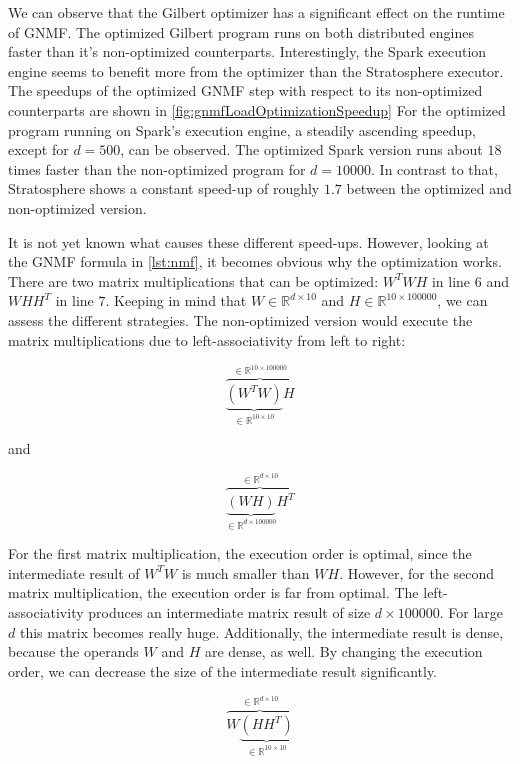 We can observe that the Gilbert optimizer has a significant effect on the runtime of GNMF.
The optimized Gilbert program runs on both distributed engines faster than it's non-optimized counterparts.
Interestingly, the Spark execution engine seems to benefit more from the optimizer than the Stratosphere executor.
The speedups of the optimized GNMF step with respect to its non-optimized counterparts are shown in \cref{fig:gnmfLoadOptimizationSpeedup}
For the optimized program running on Spark's execution engine, a steadily ascending speedup, except for $d=500$, can be observed.
The optimized Spark version runs about $18$ times faster than the non-optimized program for $d=10000$.
In contrast to that, Stratosphere shows a constant speed-up of roughly $1.7$ between the optimized and non-optimized version.

It is not yet known what causes these different speed-ups.
However, looking at the GNMF formula in \cref{lst:nmf}, it becomes obvious why the optimization works.
There are two matrix multiplications that can be optimized: $W^T WH$ in line $6$ and $WHH^T$ in line $7$.
Keeping in mind that $W\in \mathbb{R}^{d\times 10}$ and $H\in \mathbb{R}^{10 \times 100000}$, we can assess the different strategies.
The non-optimized version would execute the matrix multiplications due to left-associativity from left to right:

\begin{displaymath}
	\overbrace{\underbrace{\left(W^T W\right)}_{\in \mathbb{R}^{10\times 10}}H}^{\in\mathbb{R}^{10\times 100000}}
\end{displaymath}

and

\begin{displaymath}
	\overbrace{\underbrace{\left(WH\right)}_{\in \mathbb{R}^{d \times 100000}}H^T}^{\in \mathbb{R}^{d\times 10}}
\end{displaymath}

For the first matrix multiplication, the execution order is optimal, since the intermediate result of $W^T W$ is much smaller than $WH$.
However, for the second matrix multiplication, the execution order is far from optimal.
The left-associativity produces an intermediate matrix result of size $d\times 100000$.
For large $d$ this matrix becomes really huge.
Additionally, the intermediate result is dense, because the operands $W$ and $H$ are dense, as well.
By changing the execution order, we can decrease the size of the intermediate result significantly.

\begin{displaymath}
	\overbrace{W\underbrace{\left(HH^T\right)}_{\in \mathbb{R}^{10 \times 10}}}^{\in \mathbb{R}^{d\times 10}}
\end{displaymath}

